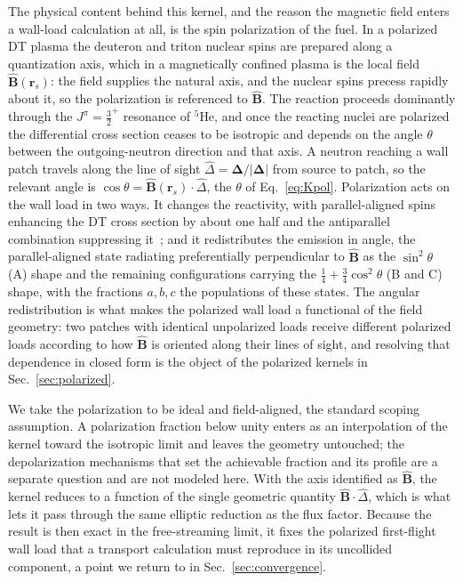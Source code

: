 \documentclass[11pt]{article}
\newcommand{\rs}{\bm{r}_s}
\newcommand{\Del}{\bm{\Delta}}
\newcommand{\Bhat}{\hat{\bm{B}}}
\begin{document}
The physical content behind this kernel, and the reason the magnetic field enters a wall-load calculation at all, is the spin polarization of the fuel. In a polarized DT plasma the deuteron and triton nuclear spins are prepared along a quantization axis, which in a magnetically confined plasma is the local field $\Bhat(\rs)$: the field supplies the natural axis, and the nuclear spins precess rapidly about it, so the polarization is referenced to $\Bhat$. The reaction proceeds dominantly through the $J^\pi=\tfrac32^+$ resonance of $^5$He, and once the reacting nuclei are polarized the differential cross section ceases to be isotropic and depends on the angle $\theta$ between the outgoing-neutron direction and that axis. A neutron reaching a wall patch travels along the line of sight $\hat\Delta=\Del/\lvert\Del\rvert$ from source to patch, so the relevant angle is $\cos\theta=\Bhat(\rs)\cdot\hat\Delta$, the $\theta$ of Eq.~\eqref{eq:Kpol}. Polarization acts on the wall load in two ways. It changes the reactivity, with parallel-aligned spins enhancing the DT cross section by about one half and the antiparallel combination suppressing it~\cite{kulsrud1982}; and it redistributes the emission in angle, the parallel-aligned state radiating preferentially perpendicular to $\Bhat$ as the $\sin^2\theta$ (A) shape and the remaining configurations carrying the $\tfrac14+\tfrac34\cos^2\theta$ (B and C) shape, with the fractions $a,b,c$ the populations of these states. The angular redistribution is what makes the polarized wall load a functional of the field geometry: two patches with identical unpolarized loads receive different polarized loads according to how $\Bhat$ is oriented along their lines of sight, and resolving that dependence in closed form is the object of the polarized kernels in Sec.~\ref{sec:polarized}.

We take the polarization to be ideal and field-aligned, the standard scoping assumption. A polarization fraction below unity enters as an interpolation of the kernel toward the isotropic limit and leaves the geometry untouched; the depolarization mechanisms that set the achievable fraction and its profile are a separate question and are not modeled here. With the axis identified as $\Bhat$, the kernel reduces to a function of the single geometric quantity $\Bhat\cdot\hat\Delta$, which is what lets it pass through the same elliptic reduction as the flux factor. Because the result is then exact in the free-streaming limit, it fixes the polarized first-flight wall load that a transport calculation must reproduce in its uncollided component, a point we return to in Sec.~\ref{sec:convergence}.
\end{document}
